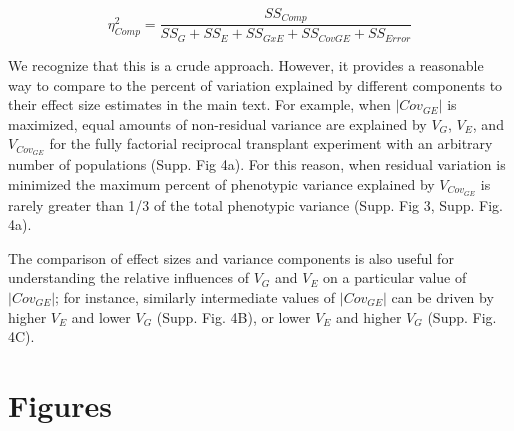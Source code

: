 \documentclass[11pt, oneside]{amsart}
\begin{document}
\begin{equation}
\eta^2_{Comp} =  \frac{SS_{Comp}}{SS_G + SS_E + SS_{GxE} + SS_{CovGE} + SS_{Error}}
\end{equation}

We recognize that this is a crude approach. However, it provides a reasonable way to compare to the percent of variation explained by different components to their effect size estimates in the main text. For example, when $| Cov_{GE} |$ is maximized, equal amounts of non-residual variance are explained by $V_G$, $V_E$, and $V_{Cov_{GE}}$ for the fully factorial reciprocal transplant experiment with an arbitrary number of populations (Supp. Fig 4a). For this reason, when residual variation is minimized the maximum percent of phenotypic variance explained by $V_{Cov_{GE}}$ is rarely greater than 1/3 of the total phenotypic variance (Supp. Fig 3, Supp. Fig. 4a).

The comparison of effect sizes and variance components is also useful for understanding the relative influences of $V_G$ and $V_E$ on a particular value of $| Cov_{GE} |$; for instance, similarly intermediate values of $| Cov_{GE} |$ can be driven by higher $V_E$ and lower $V_G$ (Supp. Fig. 4B), or lower $V_E$ and higher $V_G$ (Supp. Fig. 4C).


\clearpage
\newpage

\renewcommand\thesection{Supplemental Figures}


\section{Figures}

\renewcommand{\figurename}{Supplementary Figure}
\end{document}

